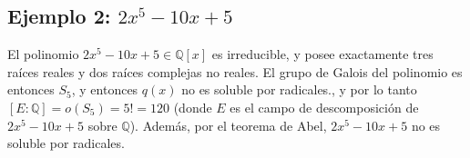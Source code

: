 \documentclass{article}
\begin{document}
\subsection*{\color{teal} Ejemplo 2: $2x^5-10x+5$}

El polinomio $2x^5-10x+5\in\mathbb{Q}[x]$ es irreducible, y posee exactamente tres raíces reales y dos raíces complejas no reales. El grupo de Galois del polinomio es entonces $S_5$, y entonces $q(x)$ no es soluble por radicales., y por lo tanto $[E:\mathbb{Q}]=o(S_5)=5!=120$ (donde $E$ es el campo de descomposición de $2x^5-10x+5$ sobre $\mathbb{Q}$). Además, por el teorema de Abel, $2x^5-10x+5$ no es soluble por radicales.
\end{document}

